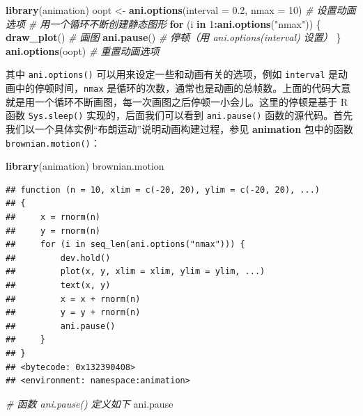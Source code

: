 \documentclass[
  b5paper,
  UTF8,twoside]{book}
\newenvironment{Shaded}{\begin{snugshade}}{\end{snugshade}}
\newcommand{\AttributeTok}[1]{\textcolor[rgb]{0.13,0.29,0.53}{#1}}
\newcommand{\CommentTok}[1]{\textcolor[rgb]{0.56,0.35,0.01}{\textit{#1}}}
\newcommand{\ControlFlowTok}[1]{\textcolor[rgb]{0.13,0.29,0.53}{\textbf{#1}}}
\newcommand{\DecValTok}[1]{\textcolor[rgb]{0.00,0.00,0.81}{#1}}
\newcommand{\FloatTok}[1]{\textcolor[rgb]{0.00,0.00,0.81}{#1}}
\newcommand{\FunctionTok}[1]{\textcolor[rgb]{0.13,0.29,0.53}{\textbf{#1}}}
\newcommand{\NormalTok}[1]{#1}
\newcommand{\OtherTok}[1]{\textcolor[rgb]{0.56,0.35,0.01}{#1}}
\newcommand{\SpecialCharTok}[1]{\textcolor[rgb]{0.81,0.36,0.00}{\textbf{#1}}}
\newcommand{\StringTok}[1]{\textcolor[rgb]{0.31,0.60,0.02}{#1}}
\begin{document}
\begin{Shaded}
\begin{Highlighting}[]
\FunctionTok{library}\NormalTok{(animation)}
\NormalTok{oopt }\OtherTok{\textless{}{-}} \FunctionTok{ani.options}\NormalTok{(}\AttributeTok{interval =} \FloatTok{0.2}\NormalTok{, }\AttributeTok{nmax =} \DecValTok{10}\NormalTok{) }\CommentTok{\# 设置动画选项}
\CommentTok{\# 用一个循环不断创建静态图形}
\ControlFlowTok{for}\NormalTok{ (i }\ControlFlowTok{in} \DecValTok{1}\SpecialCharTok{:}\FunctionTok{ani.options}\NormalTok{(}\StringTok{"nmax"}\NormalTok{)) \{}
  \FunctionTok{draw\_plot}\NormalTok{() }\CommentTok{\# 画图}
  \FunctionTok{ani.pause}\NormalTok{() }\CommentTok{\# 停顿（用 ani.options(\textquotesingle{}interval\textquotesingle{}) 设置）}
\NormalTok{\}}
\FunctionTok{ani.options}\NormalTok{(oopt) }\CommentTok{\# 重置动画选项}
\end{Highlighting}
\end{Shaded}

其中 \texttt{ani.options()} 可以用来设定一些和动画有关的选项，例如 \texttt{interval} 是动画中的停顿时间，\texttt{nmax} 是循环的次数，通常也是动画的总帧数。上面的代码大意就是用一个循环不断画图，每一次画图之后停顿一小会儿。这里的停顿是基于 R 函数 \texttt{Sys.sleep()} 实现的，后面我们可以看到 \texttt{ani.pause()} 函数的源代码。首先我们以一个具体实例``布朗运动''说明动画构建过程，参见 \textbf{animation} 包中的函数 \texttt{brownian.motion()}：

\begin{Shaded}
\begin{Highlighting}[]
\FunctionTok{library}\NormalTok{(animation)}
\NormalTok{brownian.motion}
\end{Highlighting}
\end{Shaded}

\begin{verbatim}
## function (n = 10, xlim = c(-20, 20), ylim = c(-20, 20), ...) 
## {
##     x = rnorm(n)
##     y = rnorm(n)
##     for (i in seq_len(ani.options("nmax"))) {
##         dev.hold()
##         plot(x, y, xlim = xlim, ylim = ylim, ...)
##         text(x, y)
##         x = x + rnorm(n)
##         y = y + rnorm(n)
##         ani.pause()
##     }
## }
## <bytecode: 0x132390408>
## <environment: namespace:animation>
\end{verbatim}

\begin{Shaded}
\begin{Highlighting}[]
\CommentTok{\# 函数 ani.pause() 定义如下}
\NormalTok{ani.pause}
\end{Highlighting}
\end{Shaded}
\end{document}
